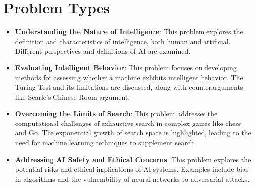 \documentclass{article}%
\begin{document}
\section{Problem Types}%
\label{sec:ProblemTypes}%
\begin{itemize}[leftmargin=*]%
\item \href{https://purdue.brightspace.com/d2l/common/assets/pdfjs-d2l-dist/1.0.14-legacy/web/viewer.html?file=%2Fcontent%2Fenforced%2F1095467-wl.202510.CS.24300.001%2F02L2-Intro.pdf%3Fou%3D1095467&lang=en-us&container=d2l-fileviewer-rendered-pdf&fullscreen=d2l-fileviewer-rendered-pdf-dialog&height=667#page=5}{\textbf{Understanding the Nature of Intelligence}}: This problem explores the definition and characteristics of intelligence, both human and artificial. Different perspectives and definitions of AI are examined.%
\item \href{https://purdue.brightspace.com/d2l/common/assets/pdfjs-d2l-dist/1.0.14-legacy/web/viewer.html?file=%2Fcontent%2Fenforced%2F1095467-wl.202510.CS.24300.001%2F02L2-Intro.pdf%3Fou%3D1095467&lang=en-us&container=d2l-fileviewer-rendered-pdf&fullscreen=d2l-fileviewer-rendered-pdf-dialog&height=667#page=6}{\textbf{Evaluating Intelligent Behavior}}: This problem focuses on developing methods for assessing whether a machine exhibits intelligent behavior. The Turing Test and its limitations are discussed, along with counterarguments like Searle's Chinese Room argument.%
\item \href{https://purdue.brightspace.com/d2l/common/assets/pdfjs-d2l-dist/1.0.14-legacy/web/viewer.html?file=%2Fcontent%2Fenforced%2F1095467-wl.202510.CS.24300.001%2F02L2-Intro.pdf%3Fou%3D1095467&lang=en-us&container=d2l-fileviewer-rendered-pdf&fullscreen=d2l-fileviewer-rendered-pdf-dialog&height=667#page=11}{\textbf{Overcoming the Limits of Search}}: This problem addresses the computational challenges of exhaustive search in complex games like chess and Go. The exponential growth of search space is highlighted, leading to the need for machine learning techniques to supplement search.%
\item \href{https://purdue.brightspace.com/d2l/common/assets/pdfjs-d2l-dist/1.0.14-legacy/web/viewer.html?file=%2Fcontent%2Fenforced%2F1095467-wl.202510.CS.24300.001%2F02L2-Intro.pdf%3Fou%3D1095467&lang=en-us&container=d2l-fileviewer-rendered-pdf&fullscreen=d2l-fileviewer-rendered-pdf-dialog&height=667#page=19}{\textbf{Addressing AI Safety and Ethical Concerns}}: This problem explores the potential risks and ethical implications of AI systems. Examples include bias in algorithms and the vulnerability of neural networks to adversarial attacks.%

\end{itemize}
\end{document}
